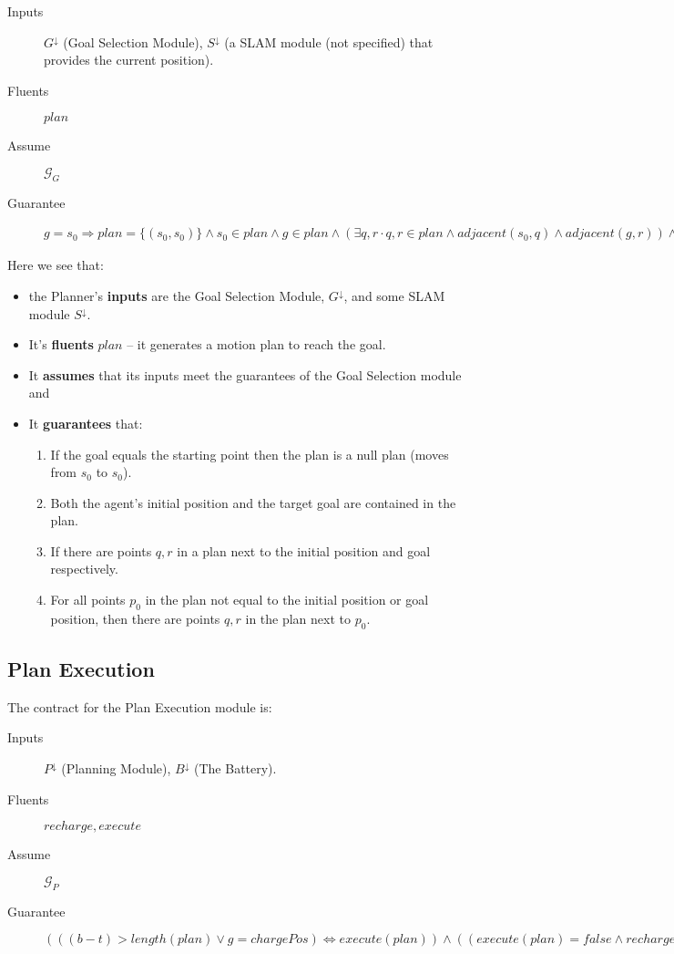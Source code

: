 \documentclass{blue-book}
\begin{document}
\begin{description}
\item[Inputs] $G^{\downarrow}$ (Goal Selection Module), $S^{\downarrow}$ (a SLAM module (not specified) that provides the current position).
\item[Fluents] $plan$
\item[Assume] $\mathcal{G}_G$
\item[Guarantee] $g = s_0 \Rightarrow plan = \{(s_0, s_0)\} \land s_0 \in plan \land g \in plan \land (\exists q, r \cdot q,r \in plan \land adjacent(s_0, q) \land adjacent(g,r)) \land \forall p_0 \cdot p_0 \in plan \land p_0\neq s_0 \land p_0 \neq g \Rightarrow (\exists q,r \cdot q,r\in p \land adjacent(q, p_0) \land adjacent(r,p_0))$
\end{description}


Here we see that:
\begin{itemize}
\item the Planner's {\bf inputs} are the Goal Selection Module, $G^{\downarrow}$, and some SLAM module $S^{\downarrow}$.
\item It's {\bf fluents} $plan$ -- it generates a motion plan to reach the goal.
\item It {\bf assumes} that its inputs meet the guarantees of the Goal Selection module and
\item It {\bf guarantees} that:
\begin{enumerate}
\item If the goal equals the starting point then the plan is a null plan (moves from $s_0$ to $s_0$).
\item Both the agent's initial position and the target goal are contained in the plan.
\item If there are points $q, r$ in a plan next to the initial position and goal respectively.
\item For all points $p_0$ in the plan not equal to the initial position or goal position, then there are points $q, r$ in the plan next to $p_0$.
\end{enumerate}
\end{itemize}

\subsection{Plan Execution}
The contract for the Plan Execution module is:

\begin{description}
\item[Inputs] $P^{\downarrow}$ (Planning Module), $B^{\downarrow}$ (The Battery).
\item[Fluents] $recharge, execute$
\item[Assume] $\mathcal{G}_P$
\item[Guarantee] $(((b - t) > length(plan) \lor g = chargePos) \iff execute(plan)) \land ( (execute(plan) = false \land recharge = true) \iff (b - t) \leq length(plan) \land g \neq chargePos) \land  \forall p \cdot p \neq plan \Rightarrow execute(p) = false$
\end{description}
 
\end{document}
